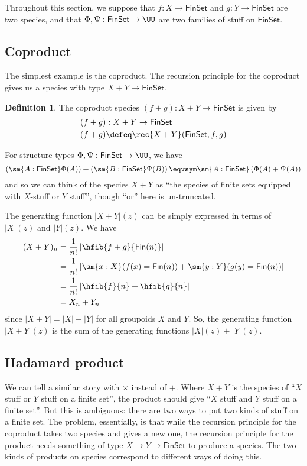 \documentclass[fleqn]{article}
\newcommand{\gf}[1]{\abs{#1}\!(z)}
\newcommand{\fin}{\mathsf{Fin}}
\newcommand{\finset}{\mathsf{FinSet}}
\newcommand{\abs}[1]{\left\lvert #1 \right\rvert}
\theoremstyle{theorem}
\theoremstyle{definition}
\newtheorem{defn}{Definition}[section]
\begin{document}
Throughout this section, we suppose that $f : X \to \finset$ and $g : Y \to
\finset$ are two species, and that $\Phi, \Psi : \finset \to \UU$ are two
families of stuff on $\finset$.


\subsection{Coproduct}

The simplest example is the coproduct.  The recursion principle for the
coproduct gives us a species with type $X + Y \to \finset$.
\begin{defn}
  The coproduct species $(f + g) : X + Y \to \finset$ is given by
  \begin{align*}
    (f + g) &: X + Y \to \finset \\
    (f + g) &\defeq \rec{X+Y}(\finset, f, g)
  \end{align*}
\end{defn}
\noindent
For structure types $\Phi, \Psi : \finset \to \UU$, we have
\[
  \left(\sm{A : \finset}\Phi(A)\right) + \left(\sm{B : \finset}\Psi(B)\right)
  \eqvsym
  \sm{A : \finset}\left(\Phi(A) + \Psi(A)\right)
\]
and so we can think of the species $X + Y$ as ``the species of finite sets
equipped with $X$-stuff or $Y$ stuff'', though ``or'' here is un-truncated.

The generating function $\gf{X + Y}$ can be simply expressed in terms of
$\gf{X}$ and $\gf{Y}$.  We have
\begin{align*}
  (X+Y)_{n}
  &=
  \frac{1}{n!}\abs{\hfib{f+g}{\fin(n)}}
  \\&=
  \frac{1}{n!}\abs{
    \sm{x:X}(f(x) = \fin(n))
    +
    \sm{y:Y}(g(y) = \fin(n))
  }
  \\&=
  \frac{1}{n!}\abs{
    \hfib{f}{n} + \hfib{g}{n}
  }
  \\&=
  X_{n} + Y_{n}
\end{align*}
since $\abs{X + Y} = \abs{X} + \abs{Y}$ for all groupoids $X$ and $Y$.  So, the
generating function $\gf{X+Y}$ is the sum of the generating functions $\gf{X}
+ \gf{Y}$.

\subsection{Hadamard product}
We can tell a similar story with $\times$ instead of $+$.  Where $X + Y$ is
the species of ``$X$ stuff or $Y$ stuff on a finite set'', the product should
give ``$X$ stuff and $Y$ stuff on a finite set''.  But this is ambiguous: there are two ways to put
two kinds of stuff on a finite set.  The problem, essentially, is that while
the recursion principle for the coproduct takes two species and gives a new
one, the recursion principle for the product needs something of type $X \to Y
\to \finset$ to produce a species.  The two kinds of products on species
correspond to different ways of doing this.
\end{document}
